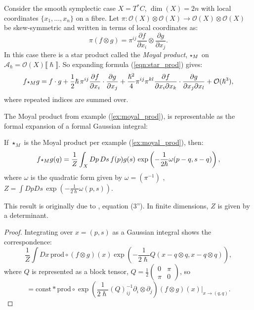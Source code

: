    \begin{ex}
    \label{ex:moyal_prod} 
    Consider the smooth symplectic case \(X = T^{*}C\), \(\dim(X)=2n\) with local coordinates \(\{x_1,\dots,x_n\}\) on a fibre. 
    Let  \( \pi : \mathcal{O}(X) \otimes \mathcal{O}(X) \rightarrow \mathcal{O}(X)\otimes \mathcal{O}(X)\) be skew-symmetric and written in terms of local coordinates as:
    \[ \pi(f \otimes g) = \pi^{ij} \frac{\partial f }{\partial x_i} \otimes \frac{\partial g}{\partial x_j }.\] 
    In this case there is a star product called the \emph{Moyal product}, \( \starp_M\) on \( \mathcal{A}_{\hslash} = \mathcal{O}(X)\lBrack \hslash \rBrack\). So expanding formula (\ref{eqn:star_prod}) gives:
    \[ f \starp_M g = f \cdot g + \frac{1}{2} \hslash \, \pi^{ij} \frac{\partial f}{\partial x_i} \cdot  \frac{\partial g}{\partial x_j} + \frac{\hslash^2}{4} \pi^{ij} \pi^{kl}\frac{\partial f}{\partial x_i \partial x_k} \cdot \frac{\partial g}{\partial  x_j \partial x_l} + \mathcal{O}(\hslash^3),\]
    where repeated indices are summed over.
    \end{ex} 
    
    The Moyal product from example (\ref{ex:moyal_prod}), is representable as the formal expansion of a formal Gaussian integral:
    \begin{lem}
    If \( \star_M \) is the Moyal product per example (\ref{ex:moyal_prod}), then:
    \[f \starp_{M} g(q) = \frac{1}{Z} \int_X D p\, Ds\, f(p) g(s) \, \exp\left( -\frac{1}{2 \hslash} \omega(p-q, s-q) \right),\]
    where \(\omega\) is the quadratic form given by \( \omega =  (\pi^{-1})\) , \( Z = \int D p Ds \, \exp\left( -\frac{1}{2 \hslash}  \omega(p,s)\right) \). 
    \end{lem}
    This result is originally due to \cite[p. 2199]{baker}, equation (3''). In finite dimensions, \(Z\) is given by a determinant. 
    \begin{proof}
    Integrating over \( x=(p,s)\) as a Gaussian integral shows the correspondence:
    \[  \frac{1}{Z} \int Dx \, \mathrm{prod} \circ  (f \otimes g) (x) \exp \left( - \frac{1}{2\hslash} Q(x-q \otimes q,x-q\otimes q) \right), \]
    where \(Q\) is represented as a block tensor, \(Q = \frac{1}{2}\left(\begin{array}{cc} 0 & \pi \\ \pi & 0 \end{array}\right) \), so  
    \[ = \mathrm{const} * \mathrm{prod} \circ \exp\left( \frac{1}{2\hslash} (Q)^{-1}_{ij} \partial_i \otimes \partial_j \right) (f\otimes g)(x)  \big|_{x \rightarrow (q,q) }.\] 
    \end{proof}
    


